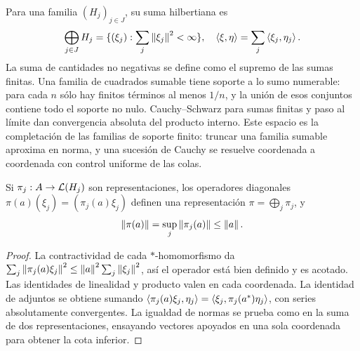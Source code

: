Para una familia $(H_j)_{j\in J}$, su suma hilbertiana es
\[
 \bigoplus_{j\in J}H_j
 =\{(\xi_j):\sum_j\left\lVert\xi_j\right\rVert^2<\infty\},
 \quad\left\langle\xi,\eta\right\rangle=\sum_j\left\langle\xi_j,\eta_j\right\rangle.
\]
La suma de cantidades no negativas se define como el supremo de las sumas finitas. Una familia de cuadrados sumable tiene soporte a lo sumo numerable: para cada $n$ sólo hay finitos términos al menos $1/n$, y la unión de esos conjuntos contiene todo el soporte no nulo. Cauchy--Schwarz para sumas finitas y paso al límite dan convergencia absoluta del producto interno. Este espacio es la completación de las familias de soporte finito: truncar una familia sumable aproxima en norma, y una sucesión de Cauchy se resuelve coordenada a coordenada con control uniforme de las colas.

\begin{proposicion}
Si $\pi_j:A\to\mathcal L(H_j)$ son representaciones, los operadores diagonales $\pi(a)(\xi_j)=(\pi_j(a)\xi_j)$ definen una representación $\pi=\bigoplus_j\pi_j$, y
\[
 \left\lVert\pi(a)\right\rVert=\sup_j\left\lVert\pi_j(a)\right\rVert\le\left\lVert a\right\rVert.
\]
\end{proposicion}
\begin{proof}
La contractividad de cada $*$-homomorfismo da
$\sum_j\left\lVert\pi_j(a)\xi_j\right\rVert^2\le\left\lVert a\right\rVert^2\sum_j\left\lVert\xi_j\right\rVert^2$, así el operador está bien definido y es acotado. Las identidades de linealidad y producto valen en cada coordenada. La identidad de adjuntos se obtiene sumando $\left\langle\pi_j(a)\xi_j,\eta_j\right\rangle=\left\langle\xi_j,\pi_j(a^*)\eta_j\right\rangle$, con series absolutamente convergentes. La igualdad de normas se prueba como en la suma de dos representaciones, ensayando vectores apoyados en una sola coordenada para obtener la cota inferior.
\end{proof}

